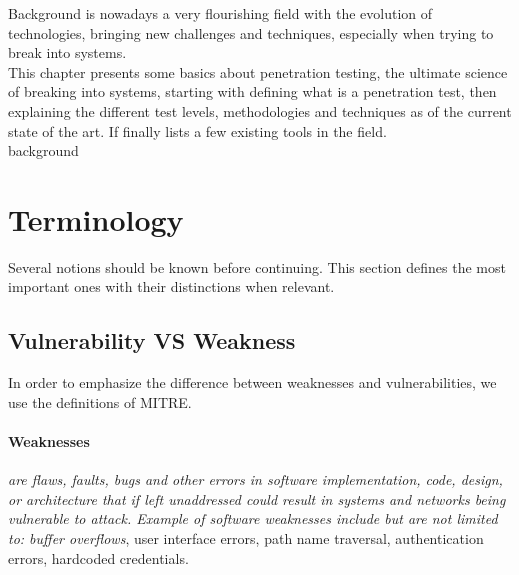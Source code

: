 \begin{chaptercover}{Background}%
{
{\large \hyphenation{}  is nowadays a very flourishing field with the evolution of technologies, bringing new challenges and techniques, especially when trying to break into systems. \newline \\ This chapter presents some basics about penetration testing, the ultimate science of breaking into systems, starting with defining what is a penetration test, then explaining the different test levels, methodologies and techniques as of the current state of the art. If finally lists a few existing tools in the field.\newline\\}}%
{background}

\section{Terminology}

Several notions should be known before continuing. This section defines the most important ones with their distinctions when relevant.

\subsection{Vulnerability VS Weakness}\label{subsec:vuln-vs-weakness}

In order to emphasize the difference between weaknesses and vulnerabilities, we use the definitions of MITRE. \cite{mitre}

\paragraph{Weaknesses} \textit{are flaws, faults, bugs and other errors in software implementation, code, design, or architecture that if left unaddressed could result in systems and networks being vulnerable to attack. Example of software weaknesses include but are not limited to: buffer overflows}, user interface errors, path name traversal, authentication errors, hardcoded credentials. \cite{mitre-cwe}


\end{chaptercover}
